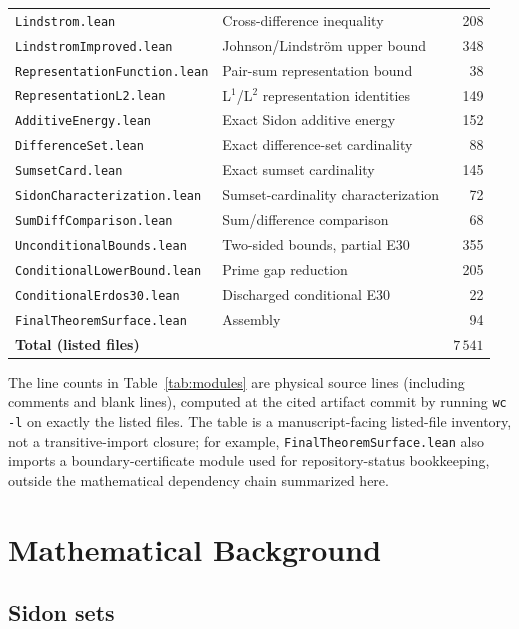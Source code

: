 \documentclass[11pt,a4paper]{article}
\begin{document}
\begin{table}[ht]
{\begin{tabular}{@{}llr@{}}
\texttt{Lindstrom.lean} & Cross-difference inequality & 208 \\
\texttt{LindstromImproved.lean} & Johnson/Lindstr\"om upper bound & 348 \\
\texttt{RepresentationFunction.lean} & Pair-sum representation bound & 38 \\
\texttt{RepresentationL2.lean} & L$^1$/L$^2$ representation identities & 149 \\
\texttt{AdditiveEnergy.lean} & Exact Sidon additive energy & 152 \\
\texttt{DifferenceSet.lean} & Exact difference-set cardinality & 88 \\
\texttt{SumsetCard.lean} & Exact sumset cardinality & 145 \\
\texttt{SidonCharacterization.lean} & Sumset-cardinality characterization & 72 \\
\texttt{SumDiffComparison.lean} & Sum/difference comparison & 68 \\
\texttt{UnconditionalBounds.lean} & Two-sided bounds, partial E30 & 355 \\
\texttt{ConditionalLowerBound.lean} & Prime gap reduction & 205 \\
\texttt{ConditionalErdos30.lean} & Discharged conditional E30 & 22 \\
\texttt{FinalTheoremSurface.lean} & Assembly & 94 \\
\midrule
\textbf{Total (listed files)} & & $7\,541$ \\
\bottomrule
\end{tabular}
}
\end{table}

The line counts in Table~\ref{tab:modules} are physical source lines
(including comments and blank lines), computed at the cited artifact commit by
running \texttt{wc -l} on exactly the listed files.  The table is a
manuscript-facing listed-file inventory, not a transitive-import closure; for example,
\texttt{FinalTheoremSurface.lean} also imports a boundary-certificate module
used for repository-status bookkeeping, outside the mathematical dependency
chain summarized here.

\clearpage

\section{Mathematical Background}
\label{sec:background}

\subsection{Sidon sets}
\end{document}
